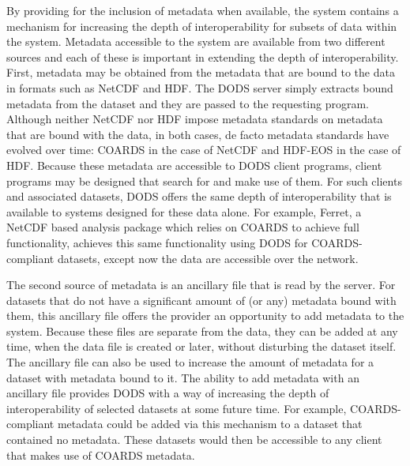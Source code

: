 \documentclass[12pt]{article}
\begin{document}
By providing for the inclusion of metadata when available, the system
contains a mechanism for increasing the depth of interoperability for subsets
of data within the system. Metadata accessible to the system are available
from two different sources and each of these is important in extending the
depth of interoperability. First, metadata may be obtained from the metadata
that are bound to the data in formats such as \acs{NetCDF} and \acs{HDF}. The
\ac{DODS} server simply extracts bound metadata from the dataset and they
are passed to the requesting program. Although neither \acs{NetCDF} nor
\acs{HDF} impose metadata standards on metadata that are bound with the
data, in both cases, de facto metadata standards have evolved over time:
\acs{COARDS} \cite{netcdf:conventions} in the case of \acs{NetCDF} and
\acs{HDF}-\acs{EOS} in the case of \acs{HDF}. Because these metadata are
accessible to \ac{DODS} client programs, client programs may be designed that
search for and make use of them. For such clients and associated datasets,
\ac{DODS} offers the same depth of interoperability that is available to
systems designed for these data alone.
For example, Ferret, a \acs{NetCDF} based analysis package which relies on
\acs{COARDS} to achieve full functionality, achieves this same functionality
using \ac{DODS} for \acs{COARDS}-compliant datasets, except now the data
are accessible over the network.

The second source of metadata is an ancillary file that is read by the
server. For datasets that do not have a significant amount of (or any)
metadata bound with them, this ancillary file offers the provider an
opportunity to add metadata to the system. Because these files are separate
from the data, they can be added at any time, when the data file is created
or later, without disturbing the dataset itself.  The ancillary file can
also be used to increase the amount of metadata for a dataset with metadata
bound to it.  The ability to add metadata with an ancillary file provides
\ac{DODS} with a way of increasing the depth of interoperability of selected
datasets at some future time. For example, \acs{COARDS}-compliant metadata
could be added via this mechanism to a dataset that contained no metadata.
These datasets would then be accessible to any client that makes use of 
\acs{COARDS} metadata.
\end{document}
